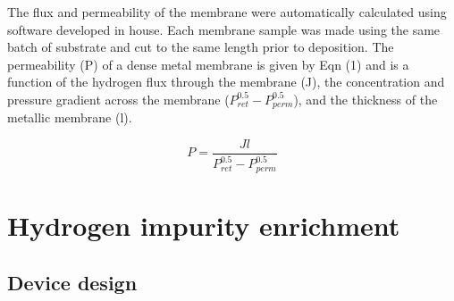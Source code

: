 The flux and permeability of the membrane were automatically calculated using software developed in house. Each membrane sample was made using the same batch of substrate and cut to the same length prior to deposition. The permeability (P)  of a dense metal membrane is given by Eqn (1) and is a function of the hydrogen flux through the membrane (J), the concentration and pressure gradient across the membrane ($P^{0.5}_{ret}-P^{0.5}_{perm}$), and the thickness of the metallic membrane (l). 

\begin{equation} \label{eq:1}
    P = \frac{J l}{P^{0.5}_{ret}-P^{0.5}_{perm}}
\end{equation}


\section{Hydrogen impurity enrichment}
\subsection{Device design}

\renewcommand{\bibname}{References}

